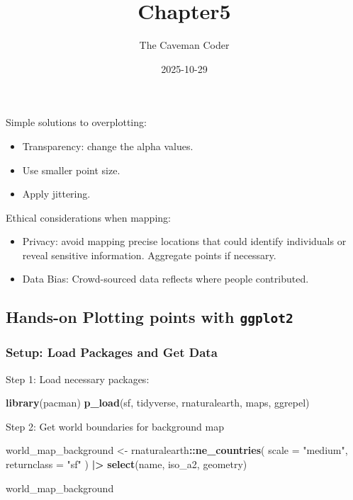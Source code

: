 \documentclass[
]{article}
\title{Chapter5}
\author{The Caveman Coder}
\date{2025-10-29}
\newenvironment{Shaded}{\begin{snugshade}}{\end{snugshade}}
\newcommand{\AttributeTok}[1]{\textcolor[rgb]{0.13,0.29,0.53}{#1}}
\newcommand{\FunctionTok}[1]{\textcolor[rgb]{0.13,0.29,0.53}{\textbf{#1}}}
\newcommand{\NormalTok}[1]{#1}
\newcommand{\OtherTok}[1]{\textcolor[rgb]{0.56,0.35,0.01}{#1}}
\newcommand{\SpecialCharTok}[1]{\textcolor[rgb]{0.81,0.36,0.00}{\textbf{#1}}}
\newcommand{\StringTok}[1]{\textcolor[rgb]{0.31,0.60,0.02}{#1}}
\providecommand{\tightlist}{%
  \setlength{\itemsep}{0pt}\setlength{\parskip}{0pt}}
\begin{document}
\maketitle

Simple solutions to overplotting:

\begin{itemize}
\tightlist
\item
  Transparency: change the alpha values.\\
\item
  Use smaller point size.\\
\item
  Apply jittering.
\end{itemize}

Ethical considerations when mapping:

\begin{itemize}
\tightlist
\item
  Privacy: avoid mapping precise locations that could identify
  individuals or reveal sensitive information. Aggregate points if
  necessary.\\
\item
  Data Bias: Crowd-sourced data reflects where people contributed.
\end{itemize}

\subsection{\texorpdfstring{Hands-on Plotting points with
\texttt{ggplot2}}{Hands-on Plotting points with ggplot2}}\label{hands-on-plotting-points-with-ggplot2}

\subsubsection{Setup: Load Packages and Get
Data}\label{setup-load-packages-and-get-data}

Step 1: Load necessary packages:

\begin{Shaded}
\begin{Highlighting}[]
\FunctionTok{library}\NormalTok{(pacman)}
\FunctionTok{p\_load}\NormalTok{(sf, tidyverse, rnaturalearth, maps, ggrepel)}
\end{Highlighting}
\end{Shaded}

Step 2: Get world boundaries for background map

\begin{Shaded}
\begin{Highlighting}[]
\NormalTok{world\_map\_background }\OtherTok{\textless{}{-}}\NormalTok{ rnaturalearth}\SpecialCharTok{::}\FunctionTok{ne\_countries}\NormalTok{(}
  \AttributeTok{scale =} \StringTok{"medium"}\NormalTok{,}
  \AttributeTok{returnclass =} \StringTok{"sf"}
\NormalTok{) }\SpecialCharTok{|\textgreater{}} 
  \FunctionTok{select}\NormalTok{(name, iso\_a2, geometry)}

\NormalTok{world\_map\_background}
\end{Highlighting}
\end{Shaded}
\end{document}
